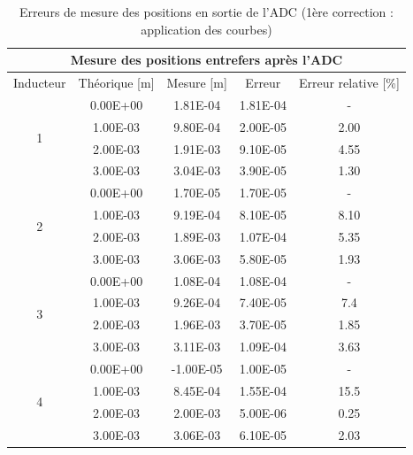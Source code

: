 \begin{table}[H]
    \centering
    \begin{tabular}{|c|c|c|c|c|}
        \hline
        \multicolumn{5}{|c|}{\textbf{Mesure des positions entrefers après l'ADC}}                     \\ \hline
        Inducteur          & Théorique {[}m{]} & Mesure {[}m{]} & Erreur   & Erreur relative {[}\%{]} \\ \hline
        \multirow{4}{*}{1} & 0.00E+00          & 1.81E-04       & 1.81E-04 & -                        \\ \cline{2-5}
                           & 1.00E-03          & 9.80E-04       & 2.00E-05 & 2.00                     \\ \cline{2-5}
                           & 2.00E-03          & 1.91E-03       & 9.10E-05 & 4.55                     \\ \cline{2-5}
                           & 3.00E-03          & 3.04E-03       & 3.90E-05 & 1.30                     \\ \hline
        \multirow{4}{*}{2} & 0.00E+00          & 1.70E-05       & 1.70E-05 & -                        \\ \cline{2-5}
                           & 1.00E-03          & 9.19E-04       & 8.10E-05 & 8.10                     \\ \cline{2-5}
                           & 2.00E-03          & 1.89E-03       & 1.07E-04 & 5.35                     \\ \cline{2-5}
                           & 3.00E-03          & 3.06E-03       & 5.80E-05 & 1.93                     \\ \hline
        \multirow{4}{*}{3} & 0.00E+00          & 1.08E-04       & 1.08E-04 & -                        \\ \cline{2-5}
                           & 1.00E-03          & 9.26E-04       & 7.40E-05 & 7.4                      \\ \cline{2-5}
                           & 2.00E-03          & 1.96E-03       & 3.70E-05 & 1.85                     \\ \cline{2-5}
                           & 3.00E-03          & 3.11E-03       & 1.09E-04 & 3.63                     \\ \hline
        \multirow{4}{*}{4} & 0.00E+00          & -1.00E-05      & 1.00E-05 & -                        \\ \cline{2-5}
                           & 1.00E-03          & 8.45E-04       & 1.55E-04 & 15.5                     \\ \cline{2-5}
                           & 2.00E-03          & 2.00E-03       & 5.00E-06 & 0.25                     \\ \cline{2-5}
                           & 3.00E-03          & 3.06E-03       & 6.10E-05 & 2.03                     \\ \hline
    \end{tabular}
    \caption{Erreurs de mesure des positions en sortie de l'ADC (1ère correction : application des courbes)}
    \label{tab:correction1_adc}
\end{table}

